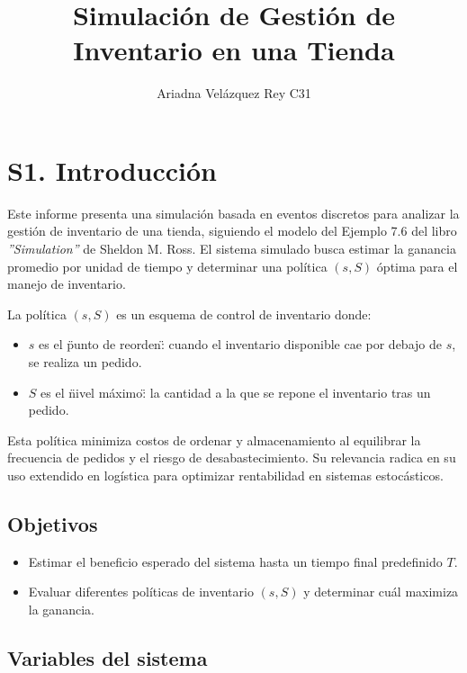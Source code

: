 \documentclass{report}
\title{Simulación de Gestión de Inventario en una Tienda}
\author{Ariadna Velázquez Rey     C31}
\date{ }
\begin{document}
\maketitle

\section*{S1. Introducción}

Este informe presenta una simulación basada en eventos discretos para analizar la gestión de 
inventario de una tienda, siguiendo el modelo del Ejemplo 7.6 del libro \textit{''Simulation''} 
de Sheldon M. Ross. El sistema simulado busca estimar la ganancia promedio por unidad de 
tiempo y determinar una política \((s, S)\) óptima para el manejo de inventario.

La política \((s, S)\) es un esquema de control de inventario donde:  
\begin{itemize}
    \item \(s\) es el \"punto de reorden\": cuando el inventario disponible cae por debajo de 
    \(s\), se realiza un pedido.  
    \item \(S\) es el \"nivel máximo\": la cantidad a la que se repone el inventario tras un 
    pedido.  
\end{itemize}

Esta política minimiza costos de ordenar y almacenamiento al equilibrar la frecuencia de pedidos 
y el riesgo de desabastecimiento. Su relevancia radica en su uso extendido en logística para 
optimizar rentabilidad en sistemas estocásticos.  

\subsection*{Objetivos}

\begin{itemize}
\item Estimar el beneficio esperado del sistema hasta un tiempo final predefinido \(T\).
\item Evaluar diferentes políticas de inventario \((s, S)\) y determinar cuál maximiza la 
ganancia.
\end{itemize}

\subsection*{Variables del sistema}
\end{document}
